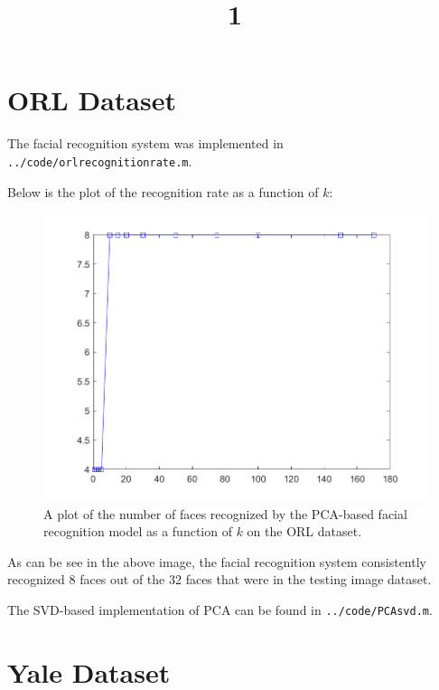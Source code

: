 \documentclass[a4paper]{article}
\title{1}
\date{}
\begin{document}
\maketitle

\section{ORL Dataset}

The facial recognition system was implemented in \texttt{../code/orl\textunderscore recognition\textunderscore rate.m}.

\medskip
Below is the plot of the recognition rate as a function of $k$:
\begin{figure}[H]
	\centering
	\includegraphics[width=\textwidth]{recognition_rate_orl.png}
	\caption{A plot of the number of faces recognized by the PCA-based facial recognition model as a function of $k$ on the ORL dataset.}
\end{figure}

As can be see in the above image, the facial recognition system consistently recognized 8 faces out of the 32 faces that were in the testing image dataset.

\medskip
The SVD-based implementation of PCA can be found in \texttt{../code/PCA\textunderscore svd.m}.

\section{Yale Dataset}
\end{document}
